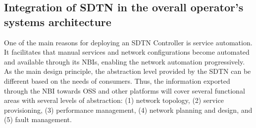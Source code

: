\documentclass[10pt, conference]{IEEEtran}
\begin{document}


\subsection{Integration of SDTN  in the overall operator’s systems architecture}
\label{section:sdtn}
One of the main reasons for deploying an SDTN Controller is service automation. It facilitates that manual services and network configurations become automated and available through its NBIs, enabling the network automation progressively. As the main design principle, the abstraction level provided by the SDTN  can be different based on the needs of consumers. Thus, the information exported through the NBI towards OSS and other platforms will cover several functional areas with several levels of abstraction: (1) network topology, (2) service provisioning, (3) performance management, (4) network planning and design, and (5) fault management. 
\end{document}

